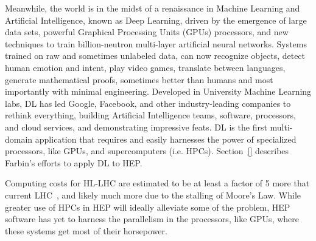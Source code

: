 


Meanwhile, the world is in the midst of a renaissance in Machine
Learning and Artificial Intelligence, known as Deep Learning, driven
by the emergence of large data sets, powerful Graphical Processing
Units (GPUs) processors, and new techniques to train billion-neutron
multi-layer artificial neural networks. Systems trained on raw and
sometimes unlabeled data, can now recognize objects, detect human
emotion and intent, play video games, translate between languages,
generate mathematical proofs, sometimes better than humans and most
importantly with minimal engineering. Developed in University Machine
Learning labs, DL has led Google, Facebook, and other industry-leading
companies to rethink everything, building Artificial Intelligence
teams, software, processors, and cloud services, and demonstrating
impressive feats. DL is the first multi-domain application that
requires and easily harnesses the power of specialized processors,
like GPUs, and supercomputers (i.e. HPCs). Section~\ref{} describes
Farbin's efforts to apply DL to HEP.

Computing costs for HL-LHC are estimated to be at least a factor of 5
more that current LHC~\cite{}, and likely much more due to the
stalling of Moore's Law. While greater use of HPCs in HEP will ideally
alleviate some of the problem, HEP software has yet to harness the
parallelism in the processors, like GPUs, where these systems get most
of their horsepower. 




